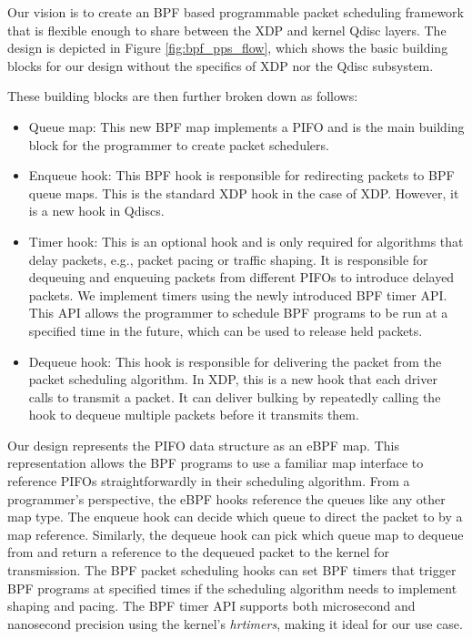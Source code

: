 \documentclass[sigconf, nonacm]{acmart}
\begin{document}
Our vision is to create an BPF based programmable packet scheduling framework that is flexible enough to share between the XDP and kernel Qdisc layers. The design is depicted in Figure \ref{fig:bpf_pps_flow}, which shows the basic building blocks for our design without the specifics of XDP nor the Qdisc subsystem.

These building blocks are then further broken down as follows:

\begin{itemize}
        \item Queue map: This new BPF map implements a PIFO and is the main building block for the programmer to create packet schedulers.
        \item Enqueue hook: This BPF hook is responsible for redirecting packets to BPF queue maps. This is the standard XDP hook in the case of XDP. However, it is a new hook in Qdiscs.
        \item Timer hook: This is an optional hook and is only required for algorithms that delay packets, e.g., packet pacing or traffic shaping. It is responsible for dequeuing and enqueuing packets from different PIFOs to introduce delayed packets. We implement timers using the newly introduced BPF timer API. This API allows the programmer to schedule BPF programs to be run at a specified time in the future, which can be used to release held packets.
        \item Dequeue hook: This hook is responsible for delivering the packet from the packet scheduling algorithm. In XDP, this is a new hook that each driver calls to transmit a packet. It can deliver bulking by repeatedly calling the hook to dequeue multiple packets before it transmits them.
\end{itemize}

Our design represents the PIFO data structure as an eBPF map. This representation allows the BPF programs to use a familiar map interface to reference PIFOs straightforwardly in their scheduling algorithm. From a programmer's perspective, the eBPF hooks reference the queues like any other map type. The enqueue hook can decide which queue to direct the packet to by a map reference. Similarly, the dequeue hook can pick which queue map to dequeue from and return a reference to the dequeued packet to the kernel for transmission. The BPF packet scheduling hooks can set BPF timers that trigger BPF programs at specified times if the scheduling algorithm needs to implement shaping and pacing. The BPF timer API supports both microsecond and nanosecond precision using the kernel's \textit{hrtimers}, making it ideal for our use case.
\end{document}
